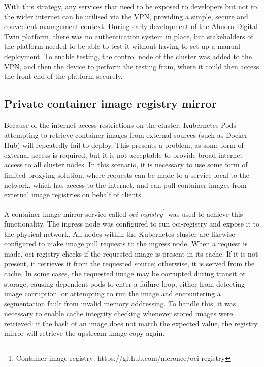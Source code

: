 With this strategy, any services that need to be exposed to developers but not to the wider internet can be utilised via the VPN, providing a simple, secure and convenient management context. During early development of the Ahuora Digital Twin platform, there was no authentication system in place, but stakeholders of the platform needed to be able to test it without having to set up a manual deployment. To enable testing, the control node of the cluster was added to the VPN, and then the device to perform the testing from, where it could then access the front-end of the platform securely.


\subsection{Private container image registry mirror}

Because of the internet access restrictions on the cluster, Kubernetes Pods attempting to retrieve container images from external sources (such as Docker Hub) will repeatedly fail to deploy. This presents a problem, as some form of external access is required, but it is not acceptable to provide broad internet access to all cluster nodes. In this scenario, it is necessary to use some form of limited proxying solution, where requests can be made to a service local to the network, which has access to the internet, and can pull container images from external image registries on behalf of clients.

A container image mirror service called \textit{oci-registry}\footnote{Container image registry: https://github.com/mcronce/oci-registry} was used to achieve this functionality. The ingress node was configured to run oci-registry  and expose it to the physical network. All nodes within the Kubernetes cluster are likewise configured to make image pull requests to the ingress node. When a request is made, oci-registry checks if the requested image is present in its cache. If it is not present, it retrieves it from the requested source; otherwise, it is served from the cache. In some cases, the requested image may be corrupted during transit or storage, causing dependent pods to enter a failure loop, either from detecting image corruption, or attempting to run the image and encountering a segmentation fault from invalid memory addressing. To handle this, it was necessary to enable cache integrity checking whenever stored images were retrieved: if the hash of an image does not match the expected value, the registry mirror will retrieve the upstream image copy again.

